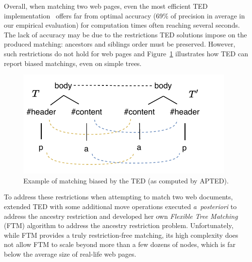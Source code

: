 Overall, when matching two web pages, even the most efficient TED implementation~\cite{pawlik2016tree} offers far from optimal accuracy (69\% of precision in average in our empirical evaluation) for computation times often reaching several seconds.
The lack of accuracy may be due to the restrictions TED solutions impose on the produced matching: ancestors and siblings order must be preserved.
However, such restrictions do not hold for web pages and Figure~\ref{fig:ted_mistake} illustrates how TED can report biased matchings, even on simple trees.

\begin{figure}
    \centering
	\includegraphics[width=.65\linewidth]{tree-matching/explanation/rted_mistake}
    \caption{Example of matching biased by the TED (as computed by APTED).}
    \label{fig:ted_mistake}
\end{figure}

To address these restrictions when attempting to match two web documents, \cite{fokaefs2011empirical} extended TED with some additional move operations executed \emph{a~posteriori} to address the ancestry restriction and \cite{Kumar2011_FTM,Kumar2011_Bricolage} developed her own \emph{Flexible Tree Matching} (FTM) algorithm to address the ancestry restriction problem.
Unfortunately, while FTM provides a truly restriction-free matching, its high complexity does not allow FTM to scale beyond more than a few dozens of nodes, which is far below the average size of real-life web pages.



